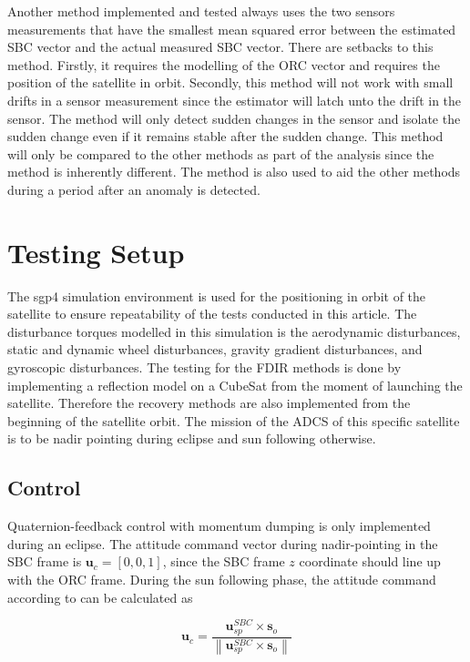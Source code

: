 \documentclass[letterpaper, 10 pt, conference]{ieeeconf}  %
\newcommand\norm[1]{\left\lVert#1\right\rVert}
\begin{document}
Another method implemented and tested always uses the two sensors measurements that have the smallest mean squared error between the estimated SBC vector and the actual measured SBC vector. There are setbacks to this method. Firstly, it requires the modelling of the ORC vector and requires the position of the satellite in orbit. Secondly, this method will not work with small drifts in a sensor measurement since the estimator will latch unto the drift in the sensor. The method will only detect sudden changes in the sensor and isolate the sudden change even if it remains stable after the sudden change. This method will only be compared to the other methods as part of the analysis since the method is inherently different. The method is also used to aid the other methods during a period after an anomaly is detected.

\section{Testing Setup}
The sgp4 simulation environment is used for the positioning in orbit of the satellite to ensure repeatability of the tests conducted in this article. The disturbance torques modelled in this simulation is the aerodynamic disturbances, static and dynamic wheel disturbances, gravity gradient disturbances, and gyroscopic disturbances. The testing for the FDIR methods is done by implementing a reflection model on a CubeSat from the moment of launching the satellite. Therefore the recovery methods are also implemented from the beginning of the satellite orbit. The mission of the ADCS of this specific satellite is to be nadir pointing during eclipse and sun following otherwise.

\subsection{Control}
Quaternion-feedback control with momentum dumping is only implemented during an eclipse. The attitude command vector during nadir-pointing in the SBC frame is $\mathbf{u}_c = [0, 0, 1]$, since the SBC frame $z$ coordinate should line up with the ORC frame. During the sun following phase, the attitude command according to \textcite{chen2000ground} can be calculated as 

\begin{equation}
\mathbf{u}_c = \frac{\mathbf{u}_{sp}^{SBC} \times \mathbf{s}_o}{\norm{\mathbf{u}_{sp}^{SBC} \times \mathbf{s}_o}}
\end{equation}
\end{document}
